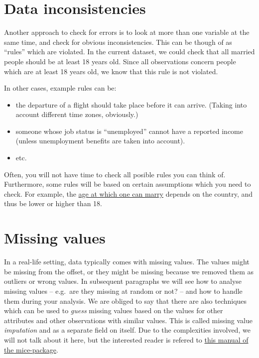 \documentclass[]{tufte-book}
\newenvironment{Shaded}{}{}
\newcommand{\KeywordTok}[1]{\textcolor[rgb]{0.00,0.44,0.13}{\textbf{#1}}}
\newcommand{\DataTypeTok}[1]{\textcolor[rgb]{0.56,0.13,0.00}{#1}}
\newcommand{\DecValTok}[1]{\textcolor[rgb]{0.25,0.63,0.44}{#1}}
\newcommand{\StringTok}[1]{\textcolor[rgb]{0.25,0.44,0.63}{#1}}
\newcommand{\OtherTok}[1]{\textcolor[rgb]{0.00,0.44,0.13}{#1}}
\newcommand{\OperatorTok}[1]{\textcolor[rgb]{0.40,0.40,0.40}{#1}}
\newcommand{\NormalTok}[1]{#1}
\providecommand{\tightlist}{%
  \setlength{\itemsep}{0pt}\setlength{\parskip}{0pt}}
\begin{document}
\begin{Shaded}
\end{Shaded}

\section{Data inconsistencies}\label{data-inconsistencies}

Another approach to check for errors is to look at more than one
variable at the same time, and check for obvious inconsistencies. This
can be though of as ``rules'' which are violated. In the current
dataset, we could check that all married people should be at least 18
years old. Since all observations concern people which are at least 18
years old, we know that this rule is not violated.

In other cases, example rules can be:

\begin{itemize}
\tightlist
\item
  the departure of a flight should take place before it can arrive.
  (Taking into account different time zones, obviously.)
\item
  someone whose job status is ``unemployed'' cannot have a reported
  income (unless unemployment benefits are taken into account).
\item
  etc.
\end{itemize}

Often, you will not have time to check all posible rules you can think
of. Furthermore, some rules will be based on certain assumptions which
you need to check. For example, the
\href{https://en.wikipedia.org/wiki/Marriageable_age}{age at which one
can marry} depends on the country, and thus be lower or higher than 18.

\section{Missing values}\label{missing-values}

In a real-life setting, data typically comes with missing values. The
values might be missing from the offset, or they might be missing
because we removed them as outliers or wrong values. In subsequent
paragraphs we will see how to analyse missing values -- e.g.~are they
missing at random or not? -- and how to handle them during your
analysis. We are obliged to say that there are also techniques which can
be used to \emph{guess} missing values based on the values for other
attributes and other observations with similar values. This is called
missing value \emph{imputation} and as a separate field on itself. Due
to the complexities involved, we will not talk about it here, but the
interested reader is refered to
\href{https://datascienceplus.com/imputing-missing-data-with-r-mice-package/}{this
manual of the mice-package}.
\end{document}

